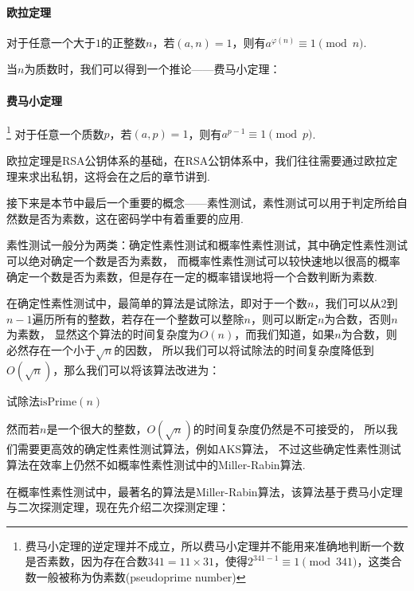 \documentclass{article}
\numberwithin{equation}{subsubsection}
\begin{document}
\paragraph{\textbf{欧拉定理}}
对于任意一个大于$1$的正整数$n$，若$(a,n)=1$，则有$a^{\varphi(n)}\equiv 1\pmod{n}$.\par
当$n$为质数时，我们可以得到一个推论——费马小定理：
\paragraph{\textbf{费马小定理}}\footnote{费马小定理的逆定理并不成立，所以费马小定理并不能用来准确地判断一个数是否素数，因为存在合数$341=11\times31$，使得$2^{341-1}\equiv 1\pmod{341}$，这类合数一般被称为伪素数(pseudoprime number)}
对于任意一个质数$p$，若$(a,p)=1$，则有$a^{p-1}\equiv 1\pmod{p}$.\par
欧拉定理是RSA公钥体系的基础，在RSA公钥体系中，我们往往需要通过欧拉定理来求出私钥，这将会在之后的章节讲到.\par
接下来是本节中最后一个重要的概念——素性测试，素性测试可以用于判定所给自然数是否为素数，这在密码学中有着重要的应用.\par
素性测试一般分为两类：确定性素性测试和概率性素性测试，其中确定性素性测试可以绝对确定一个数是否为素数，
而概率性素性测试可以较快速地以很高的概率确定一个数是否为素数，但是存在一定的概率错误地将一个合数判断为素数.\par
在确定性素性测试中，最简单的算法是试除法，即对于一个数$n$，我们可以从$2$到$n-1$遍历所有的整数，若存在一个整数可以整除$n$，则可以断定$n$为合数，否则$n$为素数，
显然这个算法的时间复杂度为$O(n)$，而我们知道，如果$n$为合数，则必然存在一个小于$\sqrt{n}$的因数，
所以我们可以将试除法的时间复杂度降低到$O(\sqrt{n})$，那么我们可以将该算法改进为：
\begin{algorithm}
    \caption{试除法$\text{isPrime}(n)$}
\end{algorithm}\par
然而若$n$是一个很大的整数，$O(\sqrt{n})$的时间复杂度仍然是不可接受的，
所以我们需要更高效的确定性素性测试算法，例如AKS算法，
不过这些确定性素性测试算法在效率上仍然不如概率性素性测试中的Miller-Rabin算法.\par
在概率性素性测试中，最著名的算法是Miller-Rabin算法，该算法基于费马小定理与二次探测定理，现在先介绍二次探测定理：
\end{document}
